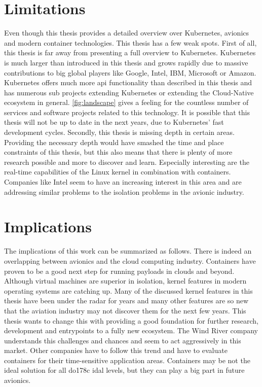 \documentclass[titlepage]{report}
\begin{document}
\section{Limitations}
Even though this thesis provides a detailed overview over Kubernetes, avionics and modern container technologies. This thesis has a few weak spots. First of all, this thesis is far away from presenting
a full overview to Kubernetes. Kubernetes is much larger than introduced in this thesis and grows rapidly due to massive contributions to big global players like Google, Intel, IBM, Microsoft or Amazon.
Kubernetes offers much more \gls{api} functionality than described in this thesis and has numerous sub projects extending Kubernetes or extending the Cloud-Native ecosystem in general. \autoref{fig:landscape}
gives a feeling for the countless number of services and software projects related to this technology. It is possible that this thesis will not be up to date in the next years, due to Kubernetes' fast development
cycles. Secondly, this thesis is missing depth in certain areas. Providing the necessary depth would have smashed the time and place constraints of this thesis, but this also means that there is plenty of more research
possible and more to discover and learn. Especially interesting are the real-time capabilities of the Linux kernel in combination with containers. Companies like Intel seem to have an increasing interest in this area
and are addressing similar problems to the isolation problems in the avionic industry.

\section{Implications}
The implications of this work can be summarized as follows. There is indeed an overlapping between avionics and the cloud computing industry. Containers have proven to be a good next step for running payloads
in clouds and beyond. Although virtual machines are superior in isolation, kernel features in modern operating systems are catching up. Many of the discussed kernel features in this thesis have been under the radar
for years and many other features are so new that the aviation industry may not discover them for the next few years. This thesis wants to change this with providing a good foundation for further research, development
and entrypoints to a fully new ecosystem. The Wind River company understands this challenges and chances and seem to act aggressively in this market. Other companies have to follow this trend and have to evaluate
containers for their time-sensitive application areas. Containers may be not the ideal solution for all \gls{do178c} \gls{idal} levels, but they can play a big part in future avionics.


\nocite{*}
\lstlistoflistings{}
\listoffigures
\printbibliography{}
\printglossary{}
\end{document}
